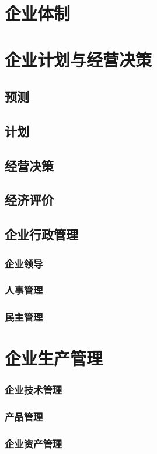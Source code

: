 \documentclass[UTF8]{../../RepresentationUniverse}
\begin{document}
\section{企业体制}
\section{企业计划与经营决策}
    \subsection{预测}
    \subsection{计划}
    \subsection{经营决策}
    \subsection{经济评价}
    \subsection{企业行政管理}
        \subsubsection{企业领导}
        \subsubsection{人事管理}
        \subsubsection{民主管理}
\section{企业生产管理}
    \subsubsection{企业技术管理}
    \subsubsection{产品管理}
    \subsubsection{企业资产管理}
\end{document}
